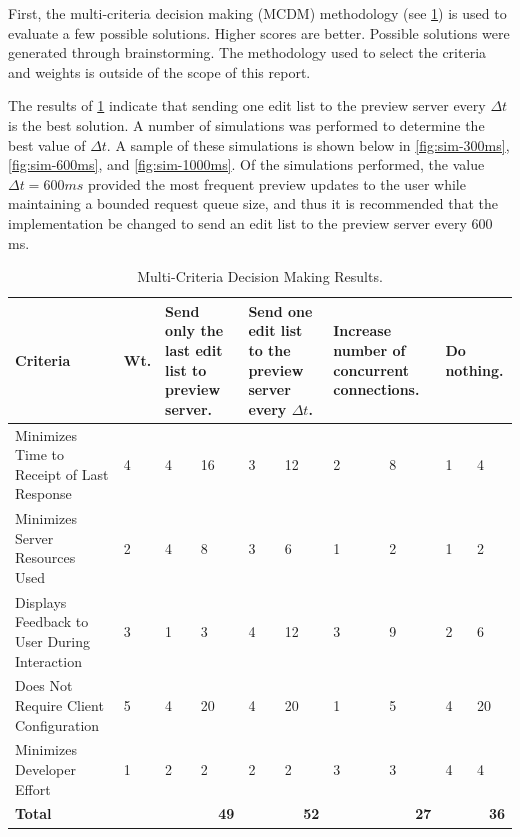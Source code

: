 \documentclass[se,resubmit]{uw-wkrpt}
\begin{document}
First, the multi-criteria decision making (MCDM) methodology (see
\ref{tbl:mcdm}) is used to evaluate a few possible solutions. Higher scores are
better. Possible solutions were generated through brainstorming.  The
methodology used to select the criteria and weights is outside of the scope of
this report.

The results of \ref{tbl:mcdm} indicate that sending one edit list to the
preview server every $\Delta t$ is the best solution. A number of simulations was
performed to determine the best value of $\Delta t$. A sample of these
simulations is shown below in \ref{fig:sim-300ms}, \ref{fig:sim-600ms}, and \ref{fig:sim-1000ms}. Of the simulations performed, the value
$\Delta t=600 ms$ provided the most frequent preview updates to the user while
maintaining a bounded request queue size, and thus it is recommended that the
implementation be changed to send an edit list to the preview server every 600
ms.

\begin{table}
  \caption{Multi-Criteria Decision Making Results.}
  \label{tbl:mcdm}
  \centering
  \begin{tabular}{|p{2.0cm}|p{1.0cm}|p{1.25cm}|p{1.25cm}|p{1.25cm}|p{1.25cm}|
                                     p{1.25cm}|p{1.25cm}|p{1.25cm}|p{1.25cm}|}
    \hline
    \textbf{Criteria} &
    \textbf{Wt.} &
    \multicolumn{2}{|p{2.5cm}|}{\textbf{Send only the last edit list to preview
    server.}} &
    \multicolumn{2}{|p{2.5cm}|}{\textbf{Send one edit list to the preview
    server every $\Delta t$.}} &
    \multicolumn{2}{|p{2.5cm}|}{\textbf{Increase number of concurrent
    connections.}} &
    \multicolumn{2}{|p{2.5cm}|}{\textbf{Do nothing.}} \\
    \hline\hline
    Minimizes Time to Receipt of Last Response &
       4 &  4 & 16 &  3 & 12 &  2 &  8 &  1 &  4 \\
    \hline
    Minimizes Server Resources Used &
       2 &  4 &  8 &  3 &  6 &  1 &  2 &  1 &  2 \\
    \hline
    Displays Feedback to User During Interaction &
       3 &  1 &  3 &  4 & 12 &  3 &  9 &  2 &  6 \\
    \hline
    Does Not Require Client Configuration &
       5 &  4 & 20 &  4 & 20 &  1 &  5 &  4 & 20 \\
    \hline
    Minimizes Developer Effort &
       1 &  2 &  2 &  2 &  2 &  3 &  3 &  4 &  4 \\
    \hline
    \hline
    \textbf{Total} &
      &
      \multicolumn{2}{|r|}{\textbf{49}} &
      \multicolumn{2}{|r|}{\textbf{52}} &
      \multicolumn{2}{|r|}{\textbf{27}} &
      \multicolumn{2}{|r|}{\textbf{36}} \\
    \hline
  \end{tabular}
\end{table}
\end{document}
